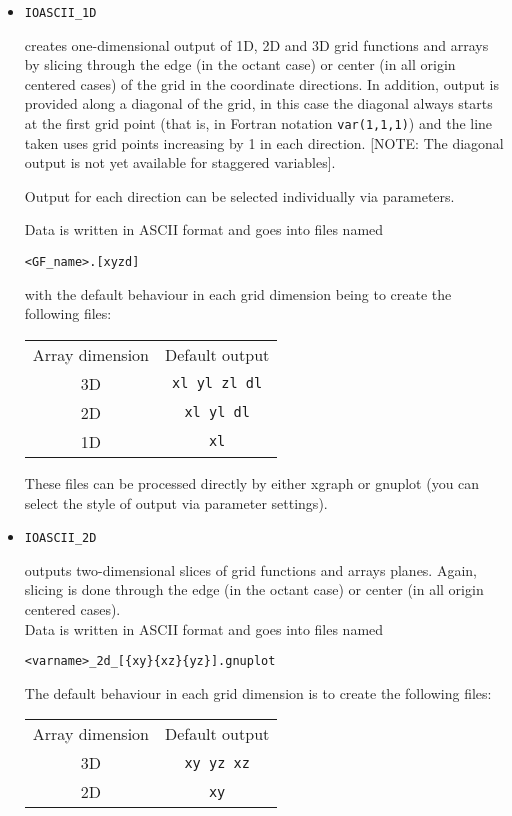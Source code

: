 \documentclass{article}
\begin{document}
\begin{itemize}

  \item {\tt IOASCII\_1D} 

  creates one-dimensional output of 1D, 2D and
  3D grid functions and arrays by slicing through the edge (in the
  octant case) or center (in all origin centered cases) of the grid in
  the coordinate directions.  In addition, output is provided
  along a diagonal of the grid, in this case the diagonal always starts
  at the first grid point (that is, in Fortran notation {\tt var(1,1,1)})
  and the line taken uses grid points increasing by 1 in each direction.
  [NOTE: The diagonal output is not yet available for staggered variables].

  Output for each direction can be
  selected individually via parameters.

  Data is written in ASCII format and goes into files named

  {\tt <GF\_name>.[xyzd]}

  with the default behaviour in each grid dimension being to create
  the following files:

  \begin{center}
  \begin{tabular}{cc}
    Array dimension & Default output \\
    3D & {\tt xl yl zl dl} \\
    2D & {\tt xl yl dl} \\
    1D & {\tt xl} 
  \end{tabular}
  \end{center}

  These files can be processed directly by either xgraph or gnuplot
  (you can select the style of output via parameter settings).

  \item {\tt IOASCII\_2D} 

  outputs two-dimensional slices of grid functions and arrays planes. 
  Again, slicing is done through the edge (in the
  octant case) or center (in all origin centered cases).\\ Data is
  written in ASCII format and goes into files named 
  
  {\tt <varname>\_2d\_[\{xy\}\{xz\}\{yz\}].gnuplot}

  The default behaviour in each grid dimension is to create
  the following files:

  \begin{center}
  \begin{tabular}{cc}
    Array dimension & Default output \\
    3D & {\tt xy yz xz} \\
    2D & {\tt xy} 
  \end{tabular}
  \end{center}


\end{itemize}
\end{document}
